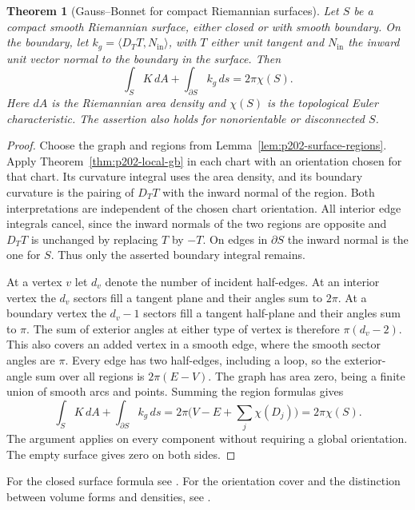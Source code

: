 \documentclass[11pt,oneside,openany]{book}
\theoremstyle{plain}
\newtheorem{theorem}{Theorem}[chapter]
\theoremstyle{definition}
\theoremstyle{remark}
\begin{document}
\begin{theorem}[Gauss--Bonnet for compact Riemannian surfaces]
\label{thm:p202-global-gb}
Let \(S\) be a compact smooth Riemannian surface, either
closed or with smooth boundary. On the boundary, let
\(k_g=\langle D_TT,N_{\mathrm{in}}\rangle\), with \(T\) either
unit tangent and \(N_{\mathrm{in}}\) the inward unit vector
normal to the boundary in the surface. Then
\[
 \int_S K\,dA+\int_{\partial S}k_g\,ds=2\pi\chi(S).
\]
Here \(dA\) is the Riemannian area density and \(\chi(S)\)
is the topological Euler characteristic. The assertion also
holds for nonorientable or disconnected \(S\).
\end{theorem}

\begin{proof}
Choose the graph and regions from Lemma~\ref{lem:p202-surface-regions}.
Apply Theorem~\ref{thm:p202-local-gb} in each chart with an
orientation chosen for that chart. Its curvature integral uses
the area density, and its boundary curvature is the pairing of
\(D_TT\) with the inward normal of the region. Both interpretations
are independent of the chosen chart orientation.
All interior edge integrals cancel, since the inward normals of
the two regions are opposite and \(D_TT\) is unchanged by replacing
\(T\) by \(-T\). On edges in \(\partial S\) the inward normal is the
one for \(S\). Thus only the asserted boundary integral remains.

At a vertex \(v\) let \(d_v\) denote the number of incident half-edges.
At an interior vertex the \(d_v\) sectors fill a tangent plane and
their angles sum to \(2\pi\). At a boundary vertex the \(d_v-1\)
sectors fill a tangent half-plane and their angles sum to \(\pi\).
The sum of exterior angles at either type of vertex is therefore
\(\pi(d_v-2)\). This also covers an added vertex in a smooth edge,
where the smooth sector angles are \(\pi\). Every edge has two
half-edges, including a loop, so the exterior-angle sum over all
regions is \(2\pi(E-V)\). The graph has area zero, being a finite
union of smooth arcs and points. Summing the region formulas gives
\[
 \int_S K\,dA+\int_{\partial S}k_g\,ds
 =2\pi\bigl(V-E+\textstyle\sum_j\chi(D_j)\bigr)
 =2\pi\chi(S).
\]
The argument applies on every component without requiring a global
orientation. The empty surface gives zero on both sides.
\end{proof}

For the closed surface formula see
\cite[Chapter 9, Theorem 9.7]{LeeRM}. For the orientation
cover and the distinction between volume forms and
densities, see \cite[Chapter 9]{P104}.
\end{document}
